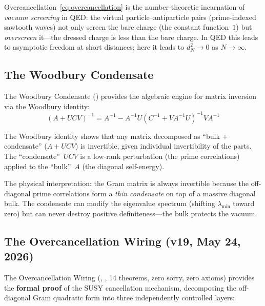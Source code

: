 \begin{correspondence}
Overcancellation~\eqref{eq:overcancellation} is the number-theoretic
incarnation of \emph{vacuum screening} in QED: the virtual
particle--antiparticle pairs (prime-indexed sawtooth waves)
not only screen the bare charge (the constant function~$1$)
but \emph{overscreen} it---the dressed charge is less than the
bare charge. In QED this leads to asymptotic freedom at short
distances; here it leads to $d_N^2 \to 0$ as $N \to \infty$.
\end{correspondence}

\subsection{The Woodbury Condensate}

The Woodbury Condensate () provides the
algebraic engine for matrix inversion via the Woodbury identity:
\begin{equation}
  (A + UCV)^{-1} = A^{-1} - A^{-1}U(C^{-1} + VA^{-1}U)^{-1}VA^{-1}
  \label{eq:woodbury}
\end{equation}

\begin{principle}
The Woodbury identity shows that any matrix decomposed as
``bulk + condensate'' ($A + UCV$) is invertible, given individual
invertibility of the parts. The ``condensate''~$UCV$ is a low-rank
perturbation (the prime correlations) applied to the ``bulk''~$A$
(the diagonal self-energy).

The physical interpretation: the Gram matrix is always
invertible because the off-diagonal prime correlations form a
\emph{thin condensate} on top of a massive diagonal bulk.
The condensate can modify the eigenvalue spectrum (shifting
$\lambda_{\min}$ toward zero) but can never destroy positive
definiteness---the bulk protects the vacuum.
\end{principle}

\subsection{The Overcancellation Wiring (v19, May 24, 2026)}

The Overcancellation Wiring (,
, 14 theorems, zero sorry, zero axioms)
provides the \textbf{formal proof} of the SUSY cancellation mechanism,
decomposing the off-diagonal Gram quadratic form into three independently
controlled layers:

